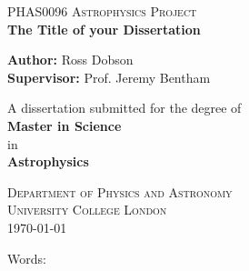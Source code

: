 \documentclass[../main]{subfiles}
\begin{document}
\begin{titlepage}
\begin{center}
    \vspace*{-4.0cm}
    
    \vfill
    
    \Large
    \textsc{PHAS0096 Astrophysics Project}\\
            
        \Huge
        {\textbf{The Title of your Dissertation}}
        
        \vfill
        
        \LARGE
        \textbf{Author:} Ross Dobson\\
        \textbf{Supervisor:} Prof. Jeremy Bentham\\
        
        \vfill
        
        \Large
        A dissertation submitted for the degree of\\
        \textbf{Master in Science}\\
        in\\
        \textbf{Astrophysics}\\
            
        \vspace{0.8cm}
        
        \Large
        \textsc{Department of Physics and Astronomy}\\
        \textsc{University College London}\\
        
        \vspace{0.5cm}
        \Large
        \today
        
        \vspace{0.5cm}
        
        \large
        Words: 
\end{center}
\end{titlepage}
\end{document}
